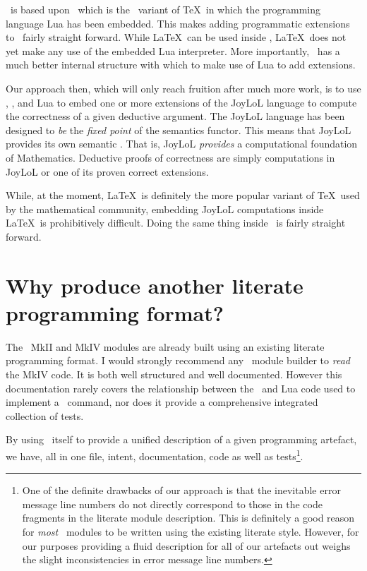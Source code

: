 \ConTeXt\ is based upon \LuaTeX\ which is the \pdfTeX\ variant of \TeX\ in 
which the programming language Lua has been embedded. This makes adding 
programmatic extensions to \ConTeXt\ fairly straight forward. While \LaTeX\ 
can be used inside \LuaTeX, \LaTeX\ does not yet make any use of the 
embedded Lua interpreter. More importantly, \ConTeXt\, has a much better 
internal structure with which to make use of Lua to add extensions. 

Our approach then, which will only reach fruition after much more work, is 
to use \ConTeXt, \LuaTeX, and Lua to embed one or more extensions of the 
JoyLoL language to compute the correctness of a given deductive argument. 
The JoyLoL language has been designed to \emph{be} the \emph{fixed point} 
of the semantics functor. This means that JoyLoL provides its own semantic 
\quote{meaning}. That is, JoyLoL \emph{provides} a computational 
foundation of Mathematics. Deductive proofs of correctness are simply 
computations in JoyLoL or one of its proven correct extensions. 

While, at the moment, \LaTeX\ is definitely the more popular variant of 
\TeX\ used by the mathematical community, embedding JoyLoL computations 
inside \LaTeX\ is prohibitively difficult. Doing the same thing inside 
\ConTeXt\ is fairly straight forward. 

\section{Why produce another literate programming format?} 

The \ConTeXt\ MkII and MkIV modules are already built using an existing 
literate programming format. I would strongly recommend any \ConTeXt\ 
module builder to \emph{read} the MkIV code. It is both well structured 
and well documented. However this documentation rarely covers the 
relationship between the \LuaTeX\ and Lua code used to implement a 
\ConTeXt\ command, nor does it provide a comprehensive integrated 
collection of tests. 

By using \ConTeXt\ itself to provide a unified description of a given 
programming artefact, we have, all in one file, intent, documentation, 
code as well as tests\footnote{One of the definite drawbacks of our 
\type{t-literate-progs} approach is that the inevitable error message line 
numbers do not directly correspond to those in the code fragments in the 
literate module description. This is definitely a good reason for 
\emph{most} \ConTeXt\ modules to be written using the existing literate 
style. However, for our purposes providing a fluid description for all of 
our artefacts out weighs the slight inconsistencies in error message line 
numbers.}. 

